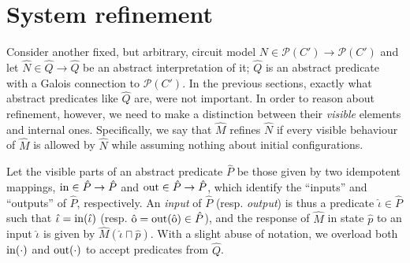 \section{System refinement}

Consider another fixed, but arbitrary, circuit model $N \in \mathcal{P}(C') \rightarrow \mathcal{P}(C')$ and let $\hat N \in \hat Q \rightarrow \hat Q$ be an abstract interpretation of it; $\hat Q$ is an abstract predicate with a Galois connection to $\mathcal{P}(C')$. In the previous sections, exactly what abstract predicates like $\hat Q$ are, were not important. In order to reason about refinement, however, we need to make a distinction between their \textit{visible} elements and internal ones. Specifically, we say that $\hat M$ refines $\hat N$ if every visible behaviour of $\hat M$ is allowed by $\hat N$ while assuming nothing about initial configurations.

Let the visible parts of an abstract predicate $\hat P$ be those given by two idempotent mappings, $\operatorname{in} \in \hat P \rightarrow \hat P$ and $\operatorname{out} \in \hat P \rightarrow \hat P$, which identify the ``inputs'' and ``outputs'' of $\hat P$, respectively. An \textit{input} of $\hat P$ (resp. \textit{output}) is thus a predicate $\hat \iota \in \hat P$ such that $\hat \iota = \operatorname{in}(\hat \iota)$ (resp. $\hat {\mathrm{o}} = \operatorname{out}(\hat {\mathrm{o}}) \in \hat P$), and the response of $\hat M$ in state $\hat p$ to an input $\hat \iota$ is given by $\hat M(\hat \iota \sqcap \hat p)$. With a slight abuse of notation, we overload both $\operatorname{in}(\cdot)$ and $\operatorname{out}(\cdot)$ to accept predicates from $\hat Q$.





